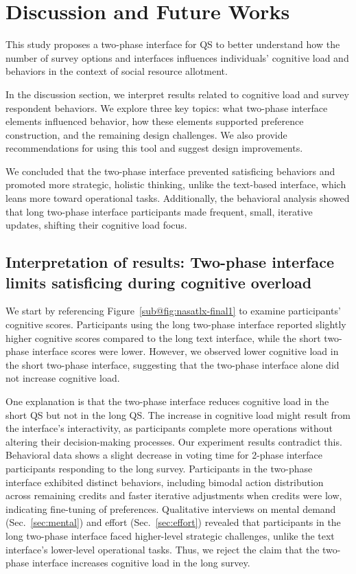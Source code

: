 \section{Discussion and Future Works}
\label{sec:discussion}
This study proposes a two-phase interface for QS to better understand how the number of survey options and interfaces influences individuals' cognitive load and behaviors in the context of social resource allotment. %

In the discussion section, we interpret results related to cognitive load and survey respondent behaviors. We explore three key topics: what two-phase interface elements influenced behavior, how these elements supported preference construction, and the remaining design challenges. We also provide recommendations for using this tool and suggest design improvements. 

We concluded that the two-phase interface prevented satisficing behaviors and promoted more strategic, holistic thinking, unlike the text-based interface, which leans more toward operational tasks. Additionally, the behavioral analysis showed that long two-phase interface participants made frequent, small, iterative updates, shifting their cognitive load focus.

\subsection{Interpretation of results: Two-phase interface limits satisficing during cognitive overload} \label{sec:satisficing}
We start by referencing Figure~\ref{sub@fig:nasatlx-final1} to examine participants' cognitive scores. Participants using the long two-phase interface reported slightly higher cognitive scores compared to the long text interface, while the short two-phase interface scores were lower. However, we observed lower cognitive load in the short two-phase interface, suggesting that the two-phase interface alone did not increase cognitive load.

One explanation is that the two-phase interface reduces cognitive load in the short QS but not in the long QS. The increase in cognitive load might result from the interface's interactivity, as participants complete more operations without altering their decision-making processes. Our experiment results contradict this. Behavioral data shows a slight decrease in voting time for 2-phase interface participants responding to the long survey. Participants in the two-phase interface exhibited distinct behaviors, including bimodal action distribution across remaining credits and faster iterative adjustments when credits were low, indicating fine-tuning of preferences. Qualitative interviews on mental demand (Sec.~\ref{sec:mental}) and effort (Sec.~\ref{sec:effort}) revealed that participants in the long two-phase interface faced higher-level strategic challenges, unlike the text interface's lower-level operational tasks. Thus, we reject the claim that the two-phase interface increases cognitive load in the long survey.

